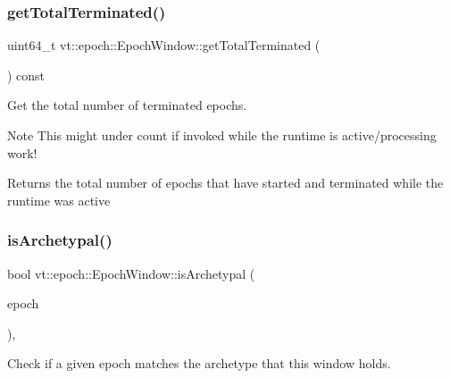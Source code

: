 \subsubsection{\texorpdfstring{get\+Total\+Terminated()}{getTotalTerminated()}}
{\footnotesize\ttfamily uint64\+\_\+t vt\+::epoch\+::\+Epoch\+Window\+::get\+Total\+Terminated (\begin{DoxyParamCaption}{ }\end{DoxyParamCaption}) const\hspace{0.3cm}{\ttfamily [inline]}}



Get the total number of terminated epochs. 

\begin{DoxyNote}{Note}
This might under count if invoked while the runtime is active/processing work!
\end{DoxyNote}
\begin{DoxyReturn}{Returns}
the total number of epochs that have started and terminated while the runtime was active 
\end{DoxyReturn}
\mbox{\label{structvt_1_1epoch_1_1_epoch_window_a9f6b34a8ba87a8a4e6669b3b09958ba2}} 
\subsubsection{\texorpdfstring{is\+Archetypal()}{isArchetypal()}}
{\footnotesize\ttfamily bool vt\+::epoch\+::\+Epoch\+Window\+::is\+Archetypal (\begin{DoxyParamCaption}\item[{\hyperlink{structvt_1_1epoch_1_1_epoch_type}{Epoch\+Type}}]{epoch }\end{DoxyParamCaption})\hspace{0.3cm}{\ttfamily [inline]}, {\ttfamily [private]}}



Check if a given epoch matches the archetype that this window holds. 

\mbox{\label{structvt_1_1epoch_1_1_epoch_window_a950c2b957d27d722e9fd311a7639c989}} 
